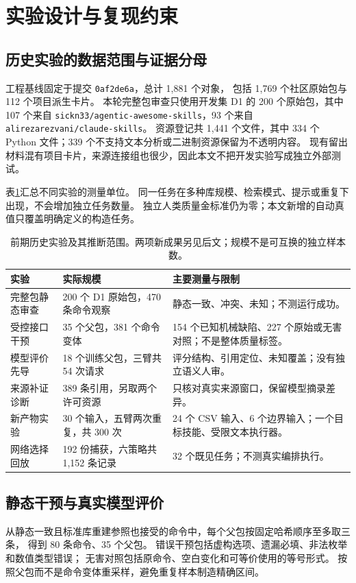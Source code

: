 \section{实验设计与复现约束}
\subsection{历史实验的数据范围与证据分母}
工程基线固定于提交 \texttt{0af2de6a}，总计 1,881 个对象，
包括 1,769 个社区原始包与 112 个项目派生卡片。
本轮完整包审查只使用开发集 D1 的 200 个原始包，其中 107 个来自
\texttt{sickn33/agentic-awesome-skills}，93 个来自 \texttt{alirezarezvani/claude-skills}。
资源登记共 1,441 个文件，其中 334 个 Python 文件；339 个不支持文本分析或二进制资源保留为不透明内容。
现有留出材料混有项目卡片，来源连接组也很少，因此本文不把开发实验写成独立外部测试。

表\ref{tab:inventory}汇总不同实验的测量单位。
同一任务在多种库规模、检索模式、提示或重复下出现，不会增加独立任务数量。
独立人类质量金标准仍为零；本文新增的自动真值只覆盖明确定义的构造任务。

\begin{table}[t]
\caption{前期历史实验及其推断范围。两项新成果另见后文；规模不是可互换的独立样本数。}
\label{tab:inventory}\centering\small
\begin{tabularx}{\textwidth}{p{}p{}X}
\toprule
实验 & 实际规模 & 主要测量与限制 \\
\midrule
完整包静态审查 & 200 个 D1 原始包，470 条命令观察 & 静态一致、冲突、未知；不测运行成功。\\
受控接口干预 & 35 个父包，381 个命令变体 & 154 个已知机械缺陷、227 个原始或无害对照；不是整体质量标签。\\
模型评价先导 & 18 个训练父包，三臂共 54 次请求 & 评分结构、引用定位、未知覆盖；没有独立语义人审。\\
来源补证诊断 & 389 条引用，另取两个许可资源 & 只核对真实来源窗口，保留模型摘录差异。\\
新产物实验 & 30 个输入，五臂两次重复，共 300 次 & 24 个 CSV 输入、6 个边界输入；一个目标技能、受限文本执行器。\\
网络选择回放 & 192 份捕获，六策略共 1,152 条记录 & 32 个既见任务；不测真实编排执行。\\
\bottomrule
\end{tabularx}
\end{table}

\subsection{静态干预与真实模型评价}
从静态一致且标准库重建参照也接受的命令中，每个父包按固定哈希顺序至多取三条，
得到 80 条命令、35 个父包。
错误干预包括虚构选项、遗漏必填、非法枚举和数值类型错误；
无害对照包括原命令、空白变化和可等价使用的等号形式。
按照父包而不是命令变体重采样，避免重复样本制造精确区间。

